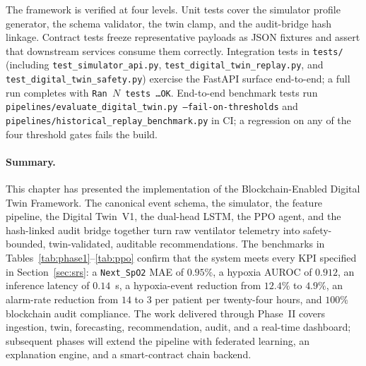 \documentclass[12pt,a4paper,oneside]{report}
\begin{document}
The framework is verified at four levels. Unit tests cover the simulator profile generator, the schema validator, the twin clamp, and the audit-bridge hash linkage. Contract tests freeze representative payloads as JSON fixtures and assert that downstream services consume them correctly. Integration tests in \texttt{tests/} (including \texttt{test\_simulator\_api.py}, \texttt{test\_digital\_twin\_replay.py}, and \texttt{test\_digital\_twin\_safety.py}) exercise the FastAPI surface end-to-end; a full run completes with \texttt{Ran $N$ tests \dots OK}. End-to-end benchmark tests run \texttt{pipelines/evaluate\_digital\_twin.py --fail-on-thresholds} and \texttt{pipelines/historical\_replay\_benchmark.py} in CI; a regression on any of the four threshold gates fails the build.

\paragraph{Summary.} This chapter has presented the implementation of the Blockchain-Enabled Digital Twin Framework. The canonical event schema, the simulator, the feature pipeline, the Digital Twin~V1, the dual-head LSTM, the PPO agent, and the hash-linked audit bridge together turn raw ventilator telemetry into safety-bounded, twin-validated, auditable recommendations. The benchmarks in Tables~\ref{tab:phase1}--\ref{tab:ppo} confirm that the system meets every KPI specified in Section~\ref{sec:srs}: a \texttt{Next\_SpO2} MAE of $0.95\%$, a hypoxia AUROC of $0.912$, an inference latency of $0.14$~s, a hypoxia-event reduction from $12.4\%$ to $4.9\%$, an alarm-rate reduction from $14$ to $3$ per patient per twenty-four hours, and $100\%$ blockchain audit compliance. The work delivered through Phase~II covers ingestion, twin, forecasting, recommendation, audit, and a real-time dashboard; subsequent phases will extend the pipeline with federated learning, an explanation engine, and a smart-contract chain backend.
\end{document}
